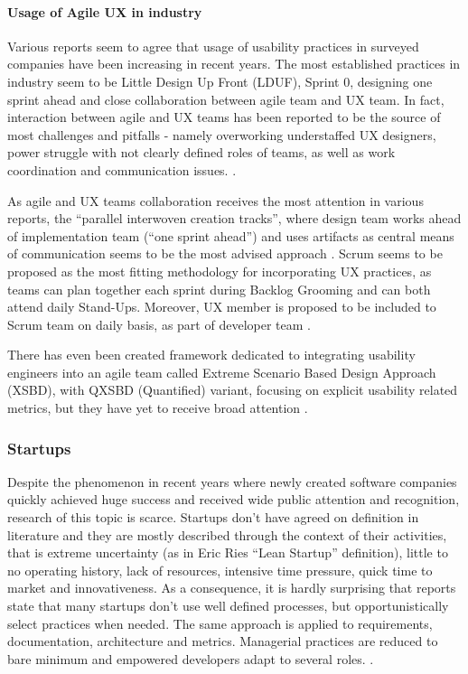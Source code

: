 \documentclass{article}
\begin{document}
\paragraph{Usage of Agile UX in industry}
Various reports seem to agree that usage of usability practices in surveyed companies have been increasing in recent years. The most established practices in industry seem to be Little Design Up Front (LDUF), Sprint 0, designing one sprint ahead and close collaboration between agile team and UX team. In fact, interaction between agile and UX teams has been reported to be the source of most challenges and pitfalls - namely overworking understaffed UX designers, power struggle with not clearly defined roles of teams, as well as work coordination and communication issues. \cite{salah2014systematic}\cite{jurca2014integrating}.

As agile and UX teams collaboration receives the most attention in various reports, the ``parallel interwoven creation tracks'', where design team works ahead of implementation team (``one sprint ahead'') and uses artifacts as central means of communication seems to be the most advised approach \cite{brhel2015exploring}. Scrum seems to be proposed as the most fitting methodology for incorporating UX practices, as teams can plan together each sprint during Backlog Grooming and can both attend daily Stand-Ups. Moreover, UX member is proposed to be included to Scrum team on daily basis, as part of developer team \cite{ovad2015prevalence}.

There has even been created framework dedicated to integrating usability engineers into an agile team called Extreme Scenario Based Design Approach (XSBD), with QXSBD (Quantified) variant, focusing on explicit usability related metrics, but they have yet to receive broad attention \cite{jurca2014integrating}.

\subsubsection{Startups}
Despite the phenomenon in recent years where newly created software companies quickly achieved huge success and received wide public attention and recognition, research of this topic is scarce. Startups don't have agreed on definition in literature and they are mostly described through the context of their activities, that is extreme uncertainty (as in Eric Ries ``Lean Startup'' \cite{ries2011lean} definition), little to no operating history, lack of resources, intensive time pressure, quick time to market and innovativeness. As a consequence, it is hardly surprising that reports state that many startups don't use well defined processes, but opportunistically select practices when needed. The same approach is applied to requirements, documentation, architecture and metrics. Managerial practices are reduced to bare minimum and empowered developers adapt to several roles. \cite{paternoster2014software}.
\end{document}
